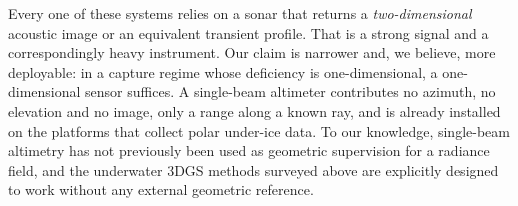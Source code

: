 \documentclass[conference]{IEEEtran}
\begin{document}
Every one of these systems relies on a sonar that returns a
\emph{two-dimensional} acoustic image or an equivalent transient profile.
That is a strong signal and a correspondingly heavy instrument. Our claim is
narrower and, we believe, more deployable: in a capture regime whose deficiency
is one-dimensional, a one-dimensional sensor suffices. A single-beam
altimeter contributes no azimuth, no elevation and no image, only a range
along a known ray, and is already installed on the platforms that collect
polar under-ice data. To our knowledge, single-beam altimetry has not
previously been used as geometric supervision for a radiance field, and the
underwater 3DGS methods surveyed above are explicitly designed to work without
any external geometric reference.

\end{document}
